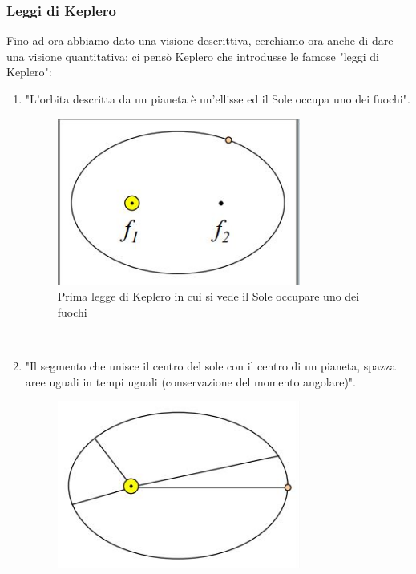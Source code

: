 \documentclass[a4paper,11pt]{article}
\begin{document}
    \subsubsection{Leggi di Keplero}
        Fino ad ora abbiamo dato una visione descrittiva, cerchiamo ora anche di dare una visione quantitativa: ci pensò Keplero che introdusse le famose "leggi di Keplero":
        \begin{enumerate}
            \item "L'orbita descritta da un pianeta è un'ellisse ed il Sole occupa uno dei fuochi".
            \\
            \begin{figure}[h!!]
                \centering
                    \includegraphics[width=8cm]{2dic/1LeggeKeplero.jpg}
                    \caption{Prima legge di Keplero in cui si vede il Sole occupare uno dei fuochi}
                \label{fig:1k}
            \end{figure}
            \\
            \item "Il segmento che unisce il centro del sole con il centro di un pianeta, spazza aree uguali in tempi uguali (conservazione del momento angolare)".
            \\
            \begin{figure}[h!!]
                \centering
                    \includegraphics[width=8cm]{2dic/2LeggeKeplero.jpg}
                    \caption{}

\end{figure}
\end{enumerate}
\end{document}
